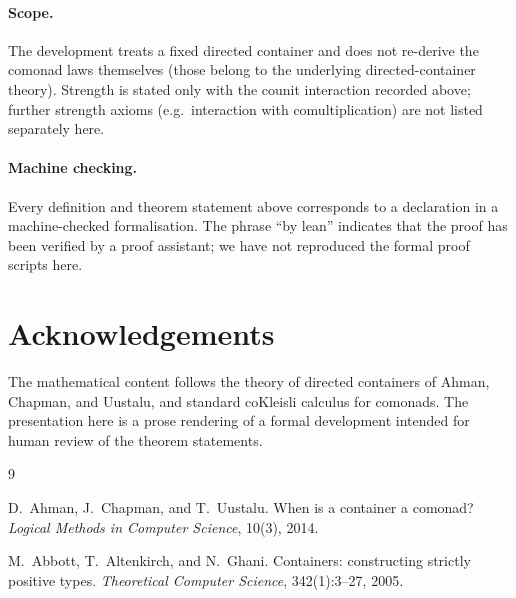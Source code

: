 \documentclass[11pt,a4paper]{article}
\theoremstyle{plain}
\theoremstyle{definition}
\begin{document}
\paragraph{Scope.}
The development treats a fixed directed container and does not re-derive the
comonad laws themselves (those belong to the underlying directed-container
theory). Strength is stated only with the counit interaction recorded above;
further strength axioms (e.g.\ interaction with comultiplication) are not
listed separately here.

\paragraph{Machine checking.}
Every definition and theorem statement above corresponds to a declaration in a
machine-checked formalisation. The phrase ``by lean'' indicates that the proof
has been verified by a proof assistant; we have not reproduced the formal
proof scripts here.

\section*{Acknowledgements}

The mathematical content follows the theory of directed containers of Ahman,
Chapman, and Uustalu, and standard coKleisli calculus for comonads. The
presentation here is a prose rendering of a formal development intended for
human review of the theorem statements.

\begin{thebibliography}{9}

D.~Ahman, J.~Chapman, and T.~Uustalu.
\newblock When is a container a comonad?
\newblock \emph{Logical Methods in Computer Science}, 10(3), 2014.

M.~Abbott, T.~Altenkirch, and N.~Ghani.
\newblock Containers: constructing strictly positive types.
\newblock \emph{Theoretical Computer Science}, 342(1):3--27, 2005.

\end{thebibliography}
\end{document}
